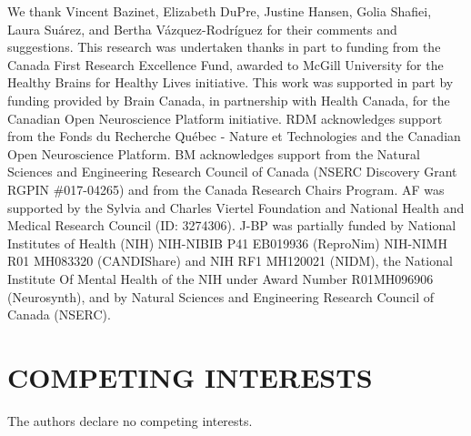 \documentclass[12pt,aps,pra,reprint,showkeys]{revtex4-1}
\renewcommand{\thetable}{\arabic{table}}
\newcommand{\beginsupplement}{
  \setcounter{equation}{0} \renewcommand{\theequation}{S\arabic{equation}}
  \setcounter{table}{0} \renewcommand{\thetable}{S\arabic{table}}
  \setcounter{figure}{0} \renewcommand{\thefigure}{S\arabic{figure}}
}
\begin{document}
We thank Vincent Bazinet, Elizabeth DuPre, Justine Hansen, Golia Shafiei, Laura Su{\'a}rez, and Bertha V{\'a}zquez-Rodr{\'i}guez for their comments and suggestions.
This research was undertaken thanks in part to funding from the Canada First Research Excellence Fund, awarded to McGill University for the Healthy Brains for Healthy Lives initiative.
This work was supported in part by funding provided by Brain Canada, in partnership with Health Canada, for the Canadian Open Neuroscience Platform initiative.
RDM acknowledges support from the Fonds du Recherche Qu{\'e}bec - Nature et Technologies and the Canadian Open Neuroscience Platform.
BM acknowledges support from the Natural Sciences and Engineering Research Council of Canada (NSERC Discovery Grant RGPIN \#017-04265) and from the Canada Research Chairs Program.
AF was supported by the Sylvia and Charles Viertel Foundation and National Health and Medical Research Council (ID: 3274306).
J-BP was partially funded by National Institutes of Health (NIH) NIH-NIBIB P41 EB019936 (ReproNim) NIH-NIMH R01 MH083320 (CANDIShare) and NIH RF1 MH120021 (NIDM), the National Institute Of Mental Health of the NIH under Award Number R01MH096906 (Neurosynth), and by Natural Sciences and Engineering Research Council of Canada (NSERC).

\section*{COMPETING INTERESTS}

The authors declare no competing interests.



\clearpage

\beginsupplement
\end{document}
